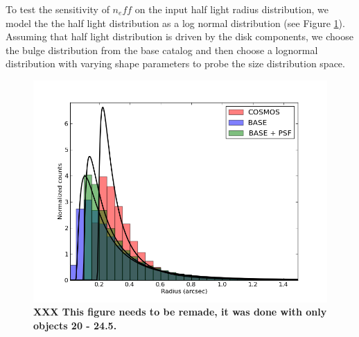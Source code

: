 \documentclass[]{article}
\begin{document}
{To test the sensitivity of $n_eff$ on the input half light radius distribution, we model the the half light distribution as a log normal distribution (see Figure
\ref{fig:hl_dist}).  Assuming that half light distribution is driven by the disk components, we choose the bulge distribution from the base catalog and then
choose a lognormal distribution with varying shape parameters to probe the size distribution space.
\begin{figure}[H]
\centering
\includegraphics[width=5in]{validation_figures/ln_fit.png}
\caption{{\bf XXX This figure needs to be remade, it was done with only objects 20 - 24.5.}\label{fig:hl_dist}}
\end{figure}

}
\end{document}
